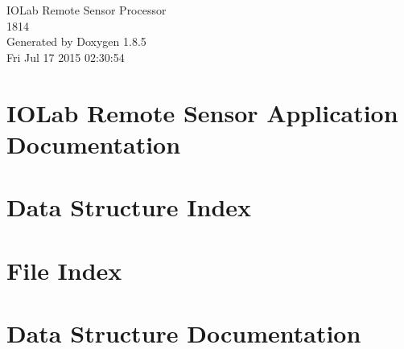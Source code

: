 \documentclass[twoside]{book}
\newcommand{\clearemptydoublepage}{%
  \newpage{\pagestyle{empty}\cleardoublepage}%
}
\begin{document}
\hypersetup{pageanchor=false}
\begin{titlepage}
\vspace*{7cm}
\begin{center}%
{\Large I\-O\-Lab Remote Sensor Processor \\[1ex]\large 1814 }\\
\vspace*{1cm}
{\large Generated by Doxygen 1.8.5}\\
\vspace*{0.5cm}
{\small Fri Jul 17 2015 02:30:54}\\
\end{center}
\end{titlepage}
\clearemptydoublepage
\tableofcontents
\clearemptydoublepage
{}
\hypersetup{pageanchor=true}

\chapter{I\-O\-Lab Remote Sensor Application Documentation}
\label{index}\hypertarget{index}{}
\chapter{Data Structure Index}

\chapter{File Index}

\chapter{Data Structure Documentation}



\end{document}
